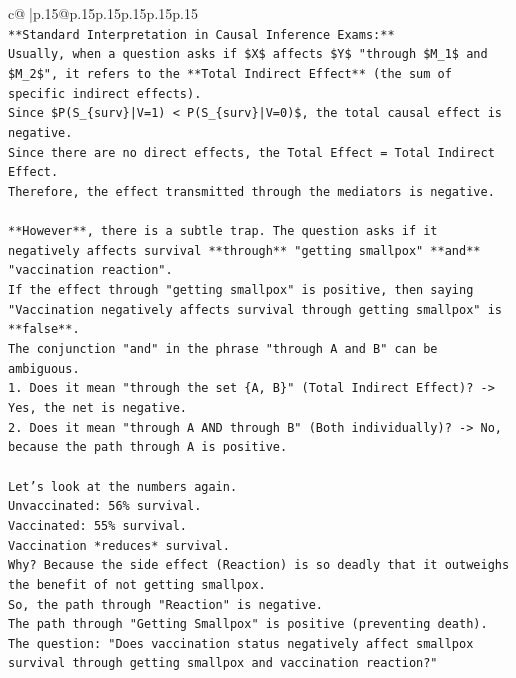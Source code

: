 \documentclass{article}
\begin{document}
{\begin{supertabular}{c@{$\;$}|p{.15\linewidth}@{}p{.15\linewidth}p{.15\linewidth}p{.15\linewidth}p{.15\linewidth}p{.15\linewidth}}
{{{\\ 
\texttt{**Standard Interpretation in Causal Inference Exams:**} \\
\texttt{Usually, when a question asks if \$X\$ affects \$Y\$ "through \$M\_1\$ and \$M\_2\$", it refers to the **Total Indirect Effect** (the sum of specific indirect effects).} \\
\texttt{Since \$P(S\_\{surv\}|V=1) < P(S\_\{surv\}|V=0)\$, the total causal effect is negative.} \\
\texttt{Since there are no direct effects, the Total Effect = Total Indirect Effect.} \\
\texttt{Therefore, the effect transmitted through the mediators is negative.} \\
\\ 
\texttt{**However**, there is a subtle trap. The question asks if it negatively affects survival **through** "getting smallpox" **and** "vaccination reaction".} \\
\texttt{If the effect through "getting smallpox" is positive, then saying "Vaccination negatively affects survival through getting smallpox" is **false**.} \\
\texttt{The conjunction "and" in the phrase "through A and B" can be ambiguous.} \\
\texttt{1.  Does it mean "through the set \{A, B\}" (Total Indirect Effect)? {-}> Yes, the net is negative.} \\
\texttt{2.  Does it mean "through A AND through B" (Both individually)? {-}> No, because the path through A is positive.} \\
\\ 
\texttt{Let's look at the numbers again.} \\
\texttt{Unvaccinated: 56\% survival.} \\
\texttt{Vaccinated: 55\% survival.} \\
\texttt{Vaccination *reduces* survival.} \\
\texttt{Why? Because the side effect (Reaction) is so deadly that it outweighs the benefit of not getting smallpox.} \\
\texttt{So, the path through "Reaction" is negative.} \\
\texttt{The path through "Getting Smallpox" is positive (preventing death).} \\
\texttt{The question: "Does vaccination status negatively affect smallpox survival through getting smallpox and vaccination reaction?"} \\
\\ 
}}}
\end{supertabular}}
\end{document}
